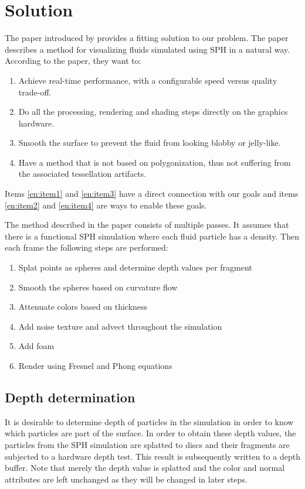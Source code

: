 \section{Solution}
The paper introduced by \cite{van2009screen} provides a fitting solution to our problem.
The paper describes a method for visualizing fluids simulated using SPH in a natural way.
According to the paper, they want to:
\begin{enumerate}
	\item \label{en:item1} Achieve real-time performance, with a configurable speed versus quality trade-off.
	\item \label{en:item2} Do all the processing, rendering and shading steps directly on the graphics hardware.
	\item \label{en:item3} Smooth the surface to prevent the fluid from looking blobby or jelly-like.
	\item \label{en:item4} Have a method that is not based on polygonization, thus not suffering from the associated tessellation artifacts.
\end{enumerate}

Items \ref{en:item1} and \ref{en:item3} have a direct connection with our goals and items \ref{en:item2} and \ref{en:item4} are ways to enable these goals.

The method described in the paper consists of multiple passes. It assumes that there is a functional SPH simulation where each fluid particle has a density. Then each frame the following steps are performed:
\begin{enumerate}
	\item Splat points as spheres and determine depth values per fragment
	\item Smooth the spheres based on curvature flow
	\item Attenuate colors based on thickness
	\item Add noise texture and advect throughout the simulation
	\item Add foam
	\item Render using Fresnel and Phong equations
\end{enumerate}

\subsection{Depth determination}
It is desirable to determine depth of particles in the simulation in order to know which particles are part of the surface. 
In order to obtain these depth values, the particles from the SPH simulation are splatted to discs and their fragments are subjected to a hardware depth test. 
This result is subsequently written to a depth buffer. 
Note that merely the depth value is splatted and the color and normal attributes are left unchanged as they will be changed in later steps.

